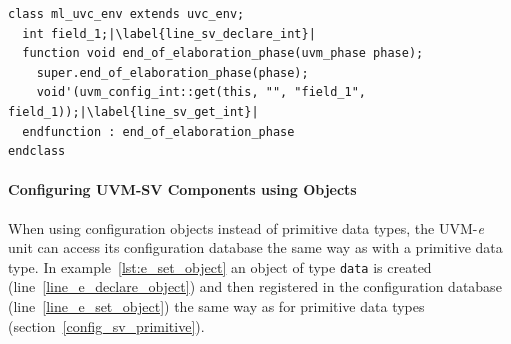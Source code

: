 \lstset{language=SystemVerilog, numbers = left, escapechar=|, breaklines=true}
\begin{lstlisting}[frame=htrbl, caption={SystemVerilog: getting an integer from configuration database},
label={lst:SV_get_int}]
class ml_uvc_env extends uvc_env;
  int field_1;|\label{line_sv_declare_int}|
  function void end_of_elaboration_phase(uvm_phase phase);
  	super.end_of_elaboration_phase(phase);
    void'(uvm_config_int::get(this, "", "field_1", field_1));|\label{line_sv_get_int}|
  endfunction : end_of_elaboration_phase
endclass
\end{lstlisting}

\paragraph{Configuring UVM-SV Components using Objects}\label{e_config_sv_object}

When using configuration objects instead of primitive data types, the UVM-\textit{e} unit can access its configuration
database the same way as with a primitive data type. In example~\ref{lst:e_set_object} an object of type \lstinline$data$ is created (line~\ref{line_e_declare_object}) and then registered in the
configuration database (line~\ref{line_e_set_object}) the same way as for primitive data types
(section~\ref{config_sv_primitive}).

